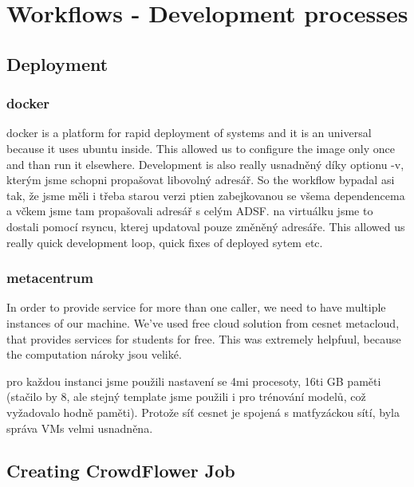 \chapter{Workflows - Development processes}

\section{Deployment}

\subsection{docker}

docker is a platform for rapid deployment of systems and it is an universal because it uses ubuntu inside. This allowed us to configure the image only once and than run it elsewhere. Development is also really usnadněný díky optionu -v, kterým jsme schopni propašovat libovolný adresář. So the workflow bypadal asi tak, že jsme měli i třeba starou verzi ptien zabejkovanou se všema dependencema a včkem jsme tam propašovali adresář s celým ADSF. na virtuálku jsme to dostali pomocí rsyncu, kterej updatoval pouze změněný adresáře. This allowed us really quick development loop, quick fixes of deployed sytem etc.

\subsection{metacentrum}

In order to provide service for more than one caller, we need to have multiple instances of our machine. We've used free cloud solution from cesnet metacloud, that provides services for students for free. This was extremely helpfuul, because the computation nároky jsou veliké.

pro každou instanci jsme použili nastavení se 4mi procesoty, 16ti GB paměti (stačilo by 8, ale stejný template jsme použili i pro trénování modelů, což vyžadovalo hodně paměti). Protože síť cesnet je spojená s matfyzáckou sítí, byla správa VMs velmi usnadněna.


\section{Creating CrowdFlower Job}

